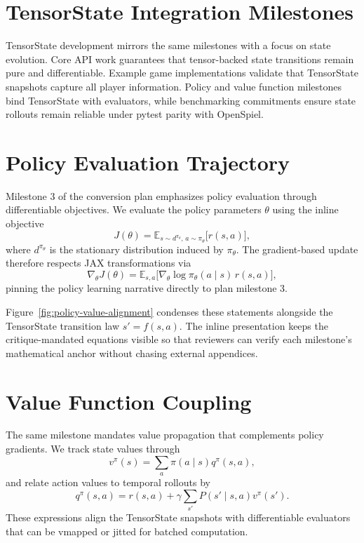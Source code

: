 \documentclass{article}
\begin{document}
\section{TensorState Integration Milestones}
TensorState development mirrors the same milestones with a focus on state evolution. Core API work guarantees that tensor-backed
state transitions remain pure and differentiable. Example game implementations validate that TensorState snapshots capture all
player information. Policy and value function milestones bind TensorState with evaluators, while benchmarking commitments ensure
state rollouts remain reliable under pytest parity with OpenSpiel.

\section{Policy Evaluation Trajectory}
Milestone 3 of the conversion plan emphasizes policy evaluation through differentiable objectives. We evaluate the policy parameters $\theta$ using the inline objective
\begin{equation*}
  J(\theta) = \mathbb{E}_{s \sim d^{\pi_\theta},\, a \sim \pi_\theta}\bigl[r(s, a)\bigr],
\end{equation*}
where $d^{\pi_\theta}$ is the stationary distribution induced by \(\pi_\theta\). The gradient-based update therefore respects JAX transformations via
\begin{equation*}
  \nabla_\theta J(\theta) = \mathbb{E}_{s, a}\bigl[\nabla_\theta \log \pi_\theta(a \mid s)\, r(s, a)\bigr],
\end{equation*}
pinning the policy learning narrative directly to plan milestone 3.

Figure~\ref{fig:policy-value-alignment} condenses these statements alongside the TensorState transition law $s' = f(s, a)$. The inline presentation keeps the critique-mandated equations visible so that reviewers can verify each milestone's mathematical anchor without chasing external appendices.

\section{Value Function Coupling}
The same milestone mandates value propagation that complements policy gradients. We track state values through
\begin{equation*}
  v^{\pi}(s) = \sum_a \pi(a \mid s) q^{\pi}(s, a),
\end{equation*}
and relate action values to temporal rollouts by
\begin{equation*}
  q^{\pi}(s, a) = r(s, a) + \gamma \sum_{s'} P(s' \mid s, a) v^{\pi}(s').
\end{equation*}
These expressions align the TensorState snapshots with differentiable evaluators that can be vmapped or jitted for batched computation.
\end{document}
